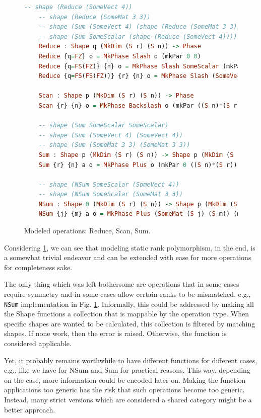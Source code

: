 \documentclass{report}
\begin{document}
\begin{figure}
\begin{lstlisting}[language=Haskell]
    -- shape (Reduce (SomeVect 4))
    -- shape (Reduce (SomeMat 3 3))
    -- shape (Sum (SomeVect 4) (shape (Reduce (SomeMat 3 3))))
    -- shape (Sum SomeScalar (shape (Reduce (SomeVect 4))))
    Reduce : Shape q (MkDim (S r) (S n)) -> Phase
    Reduce {q=FZ} o = MkPhase Slash o (mkPar 0 0)
    Reduce {q=FS(FZ)} {n} o = MkPhase Slash SomeScalar (mkPar (S n) 0)
    Reduce {q=FS(FS(FZ))} {r} {n} o = MkPhase Slash (SomeVect (S n)) (mkPar ((S n)*(S r)) 0)

    Scan : Shape p (MkDim (S r) (S n)) -> Phase
    Scan {r} {n} o = MkPhase Backslash o (mkPar ((S n)*(S r)) 0)

    -- shape (Sum SomeScalar SomeScalar)
    -- shape (Sum (SomeVect 4) (SomeVect 4))
    -- shape (Sum (SomeMat 3 3) (SomeMat 3 3))
    Sum : Shape p (MkDim (S r) (S n)) -> Shape p (MkDim (S r) (S n)) -> Phase
    Sum {r} {n} a o = MkPhase Plus o (mkPar 0 ((S n)*(S r)))

    -- shape (NSum SomeScalar (SomeVect 4))
    -- shape (NSum SomeScalar (SomeMat 3 3))
    NSum : Shape 0 (MkDim (S r) (S n)) -> Shape p (MkDim (S j) (S m)) -> Phase
    NSum {j} {m} a o = MkPhase Plus (SomeMat (S j) (S m)) (mkPar 0 ((S j)*(S m)))
\end{lstlisting}
    \caption{Modeled operations: Reduce, Scan, Sum.}
    \label{fig:modeled}
\end{figure}

Considering \ref{fig:modeled}, we can see that modeling static rank polymorphism, in the end, is a somewhat trivial endeavor and can be extended with ease for more operations for completeness sake.

The only thing which was left bothersome are operations that in some cases require symmetry and in some cases allow certain ranks to be mismatched, e.g., \verb|NSum| implementation in Fig. \ref{fig:modeled}. Informally, this could be addressed by making all the Shape functions a collection that is mappable by the operation type. When specific shapes are wanted to be calculated, this collection is filtered by matching shapes. If none work, then the error is raised. Otherwise, the function is considered applicable.

Yet, it probably remains worthwhile to have different functions for different cases, e.g., like we have for NSum and Sum for practical reasons. This way, depending on the case, more information could be encoded later on. Making the function applications too generic has the risk that such operations become too generic. Instead, many strict versions which are considered a shared category might be a better approach.
\end{document}
